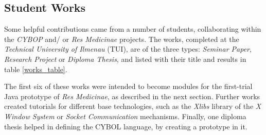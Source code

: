 %
%
%
%
%
%
%

\subsection{Student Works}
\label{student_works_heading}

Some helpful contributions came from a number of students, collaborating within
the \emph{CYBOP} and/ or \emph{Res Medicinae} projects. The works, completed at
the \emph{Technical University of Ilmenau} (TUI), are of the three types:
\emph{Seminar Paper}, \emph{Research Project} or \emph{Diploma Thesis}, and
listed with their title and results in table \ref{works_table}.

\newpage

The first six of these works were intended to become modules for the first-trial
Java prototype of \emph{Res Medicinae}, as described in the next section.
Further works created tutorials for different base technologies, such as the
\emph{Xlibs} library of the \emph{X Window System} or \emph{Socket Communication}
mechanisms. Finally, one diploma thesis helped in defining the CYBOL language,
by creating a prototype in it.

